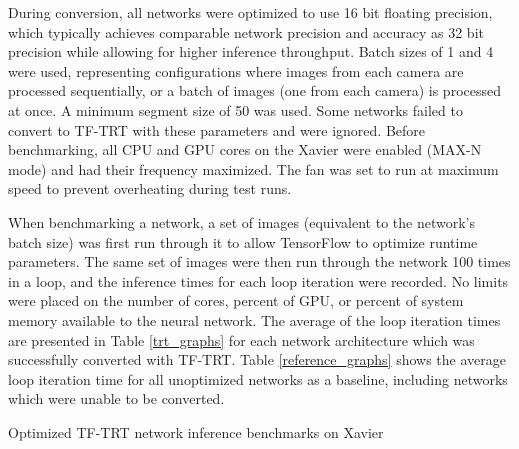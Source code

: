 During conversion, all networks were optimized to use 16 bit floating precision, which typically achieves comparable network precision and accuracy as 32 bit precision while allowing for higher inference throughput. Batch sizes of 1 and 4 were used, representing configurations where images from each camera are processed sequentially, or a batch of images (one from each camera) is processed at once. A minimum segment size of 50 was used. Some networks failed to convert to TF-TRT with these parameters and were ignored. Before benchmarking, all CPU and GPU cores on the Xavier were enabled (MAX-N mode) and had their frequency maximized. The fan was set to run at maximum speed to prevent overheating during test runs. 

When benchmarking a network, a set of images (equivalent to the network's batch size) was first run through it to allow TensorFlow to optimize runtime parameters. The same set of images were then run through the network 100 times in a loop, and the inference times for each loop iteration were recorded. No limits were placed on the number of cores, percent of GPU, or percent of system memory available to the neural network. The average of the loop iteration times are presented in Table \ref{trt_graphs} for each network architecture which was successfully converted with TF-TRT. Table \ref{reference_graphs} shows the average loop iteration time for all unoptimized networks as a baseline, including networks which were unable to be converted.


\begin{table}
	\centering
	\begin{adjustbox}{max width=.95\textwidth}
	\end{adjustbox}
	\caption{Optimized TF-TRT network inference benchmarks on Xavier}
	\label{trt_graphs}
\end{table}

